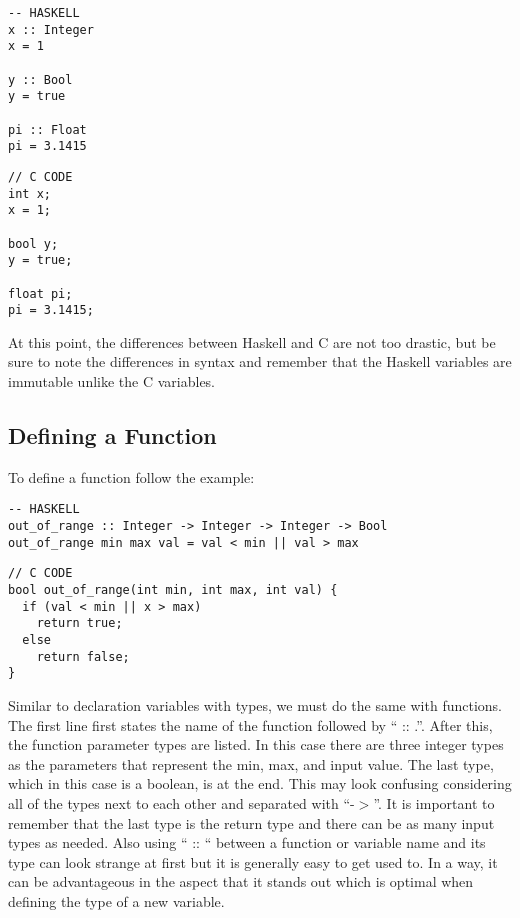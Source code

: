 \documentclass{article}
\begin{document}
\begin{lstlisting}[style=HaskellStyle]
-- HASKELL
x :: Integer
x = 1

y :: Bool
y = true

pi :: Float
pi = 3.1415
\end{lstlisting}

\begin{lstlisting}[style=CStyle]
// C CODE
int x;
x = 1;

bool y;
y = true;

float pi;
pi = 3.1415;
\end{lstlisting}

\medskip\noindent
At this point, the differences between Haskell and C are not too drastic, but be sure to note the differences in syntax and remember that the Haskell variables are immutable unlike the C variables.

\subsection{Defining a Function}
\medskip\noindent
To define a function follow the example:

\begin{lstlisting}[style=HaskellStyle]
-- HASKELL
out_of_range :: Integer -> Integer -> Integer -> Bool
out_of_range min max val = val < min || val > max
\end{lstlisting}

\begin{lstlisting}[style=CStyle]
// C CODE
bool out_of_range(int min, int max, int val) {
  if (val < min || x > max)
    return true;
  else
    return false;
}
\end{lstlisting}

\medskip\noindent
Similar to declaration variables with types, we must do the same with functions. The first line first states the name of the function followed by “ :: .”. After this, the function parameter types are listed. In this case there are three integer types as the parameters that represent the min, max, and input value. The last type, which in this case is a boolean, is at the end. This may look confusing considering all of the types next to each other and separated with “-$>$”. It is important to remember that the last type is the return type and there can be as many input types as needed. Also using “ :: “ between a function or variable name and its type can look strange at first but it is generally easy to get used to. In a way, it can be advantageous in the aspect that it stands out which is optimal when defining the type of a new variable.
\end{document}
